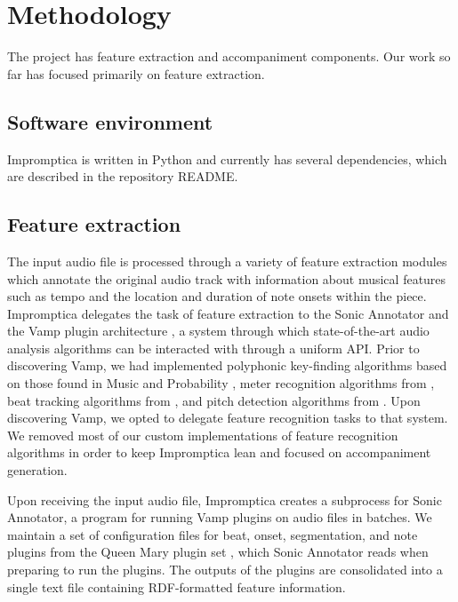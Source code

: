 \documentclass[11pt,conference,letterpaper]{IEEEtran}
\begin{document}
\section{Methodology}

The project has feature extraction and accompaniment components. Our work so far has focused primarily on feature extraction.

\subsection{Software environment}

Impromptica is written in Python and currently has several dependencies, which are described in the repository README.

\subsection{Feature extraction}

The input audio file is processed through a variety of feature extraction modules which annotate the original audio track with information about musical features such as tempo and the location and duration of note onsets within the piece. Impromptica delegates the task of feature extraction to the Sonic Annotator and the Vamp plugin architecture \cite{cannam2010sonic}, a system through which state-of-the-art audio analysis algorithms can be interacted with through a uniform API. Prior to discovering Vamp, we had implemented polyphonic key-finding algorithms based on those found in Music and Probability \cite{temperly2007mprob}, meter recognition algorithms from \cite{klapuri2006analysis}, beat tracking algorithms from \cite{ellis2007beat}, and pitch detection algorithms from \cite{klapuri2003multiple}. Upon discovering Vamp, we opted to delegate feature recognition tasks to that system. We removed most of our custom implementations of feature recognition algorithms in order to keep Impromptica lean and focused on accompaniment generation.

Upon receiving the input audio file, Impromptica creates a subprocess for Sonic Annotator, a program for running Vamp plugins on audio files in batches. We maintain a set of configuration files for beat, onset, segmentation, and note plugins from the Queen Mary plugin set \cite{TODO}, which Sonic Annotator reads when preparing to run the plugins. The outputs of the plugins are consolidated into a single text file containing RDF-formatted feature information.
\end{document}
